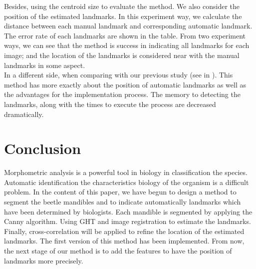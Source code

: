 \documentclass[twoside,twocolumn,10pt]{article}
\begin{document}
Besides, using the centroid size to evaluate the method. We also consider the position of the estimated landmarks. In this experiment way, we calculate the distance between each manual landmark and corresponding automatic landmark. The error rate of each landmarks are shown in the table.
From two experiment ways, we can see that the method is success in indicating all landmarks for each image; and the location of the landmarks is considered near with the manual landmarks in some aspect.\\
In a different side, when comparing with our previous study (see in \cite{est}). This method has more exactly about the position of automatic landmarks as well as the advantages for the implementation process. The memory to detecting the landmarks, along with the times to execute the process are decreased dramatically.
\section{Conclusion}
Morphometric analysis is a powerful tool in biology in classification the species. Automatic identification the characteristics biology of the organism is a difficult problem. In the content of this paper, we have begun to design a method to segment the beetle mandibles and to indicate automatically landmarks which have been determined by biologists. Each mandible is segmented by applying the Canny algorithm. Using GHT and image registration to estimate the landmarks. Finally, cross-correlation will be applied to refine the location of the estimated landmarks. The first version of this method has been implemented. From now, the next stage of our method is to add the features to have the position of landmarks more precisely.
%
%
\end{document}
